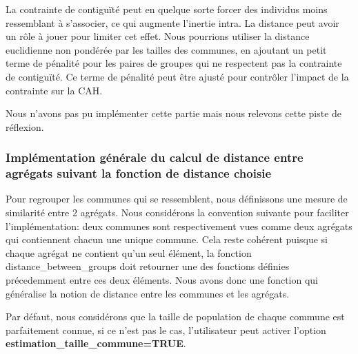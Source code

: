 \documentclass[
]{article}
\begin{document}
La contrainte de contiguïté peut en quelque sorte forcer des individus
moins ressemblant à s'associer, ce qui augmente l'inertie intra. La
distance peut avoir un rôle à jouer pour limiter cet effet. Nous
pourrions utiliser la distance euclidienne non pondérée par les tailles
des communes, en ajoutant un petit terme de pénalité pour les paires de
groupes qui ne respectent pas la contrainte de contiguïté. Ce terme de
pénalité peut être ajusté pour contrôler l'impact de la contrainte sur
la CAH.

Nous n'avons pas pu implémenter cette partie mais nous relevons cette
piste de réflexion.

\hypertarget{impluxe9mentation-guxe9nuxe9rale-du-calcul-de-distance-entre-agruxe9gats-suivant-la-fonction-de-distance-choisie}{%
\subsubsection{Implémentation générale du calcul de distance entre
agrégats suivant la fonction de distance
choisie}\label{impluxe9mentation-guxe9nuxe9rale-du-calcul-de-distance-entre-agruxe9gats-suivant-la-fonction-de-distance-choisie}}

Pour regrouper les communes qui se ressemblent, nous définissons une
mesure de similarité entre 2 agrégats. Nous considérons la convention
suivante pour faciliter l'implémentation: deux communes sont
respectivement vues comme deux agrégats qui contiennent chacun une
unique commune. Cela reste cohérent puisque si chaque agrégat ne
contient qu'un seul élément, la fonction distance\_between\_groups doit
retourner une des fonctions définies précedemment entre ces deux
éléments. Nous avons donc une fonction qui généralise la notion de
distance entre les communes et les agrégats.

Par défaut, nous considérons que la taille de population de chaque
commune est parfaitement connue, si ce n'est pas le cas, l'utilisateur
peut activer l'option \textbf{estimation\_taille\_commune=TRUE}.
\end{document}

